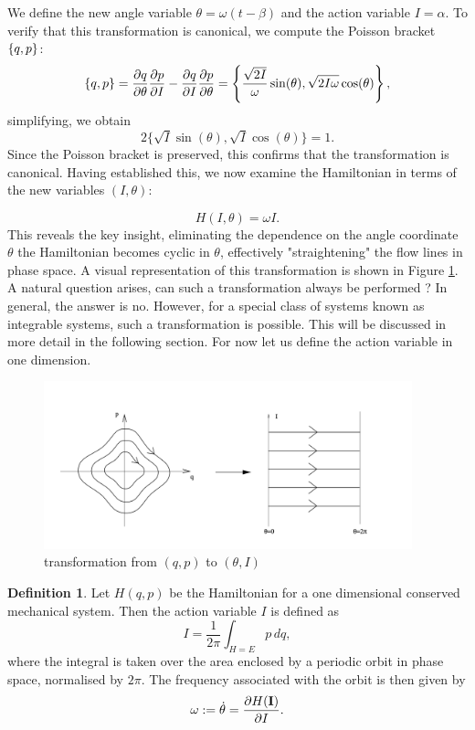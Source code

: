 \documentclass[12pt,oneside]{report}
\theoremstyle{definition}
\newtheorem{definition}{Definition}
\begin{document}
We define the new angle variable $\theta = \omega (t - \beta)$ and the action variable $I = \alpha$. To verify that this transformation is canonical, we compute the Poisson bracket $\displaystyle \left\{ q , p \right\}$:
$$\displaystyle \left\{ q , p \right\} = \frac{\partial q}{\partial \theta} \frac{\partial p}{\partial I} - \frac{\partial q}{\partial I} \frac{\partial p}{\partial \theta} = \left\{\frac{\sqrt{2I}}{\omega} \sin(\theta), \sqrt{2I\omega} \cos(\theta)\right\}, $$
simplifying, we obtain
$$ 2 \{ \sqrt{I} \sin(\theta), \sqrt{I} \cos(\theta) \} = 1. $$ Since the Poisson bracket is preserved, this confirms that the transformation is canonical. Having established this, we now examine the Hamiltonian in terms of the new variables $(I, \theta)$:

$$ H(I,\theta) = \omega I. $$ 
This reveals the key insight, eliminating the dependence on the angle coordinate $\theta$ the Hamiltonian becomes cyclic in $\theta$, effectively "straightening" the flow lines in phase space. A visual representation of this transformation is shown in Figure \ref{flow lines action}. A natural question arises, can such a transformation always be performed ? In general, the answer is no. However, for a special class of systems known as integrable systems, such a transformation is possible. This will be discussed in more detail in the following section. For now let us define the action variable in one dimension.
\begin{figure}[htbp]
    \centering
    \includegraphics[width=0.95\textwidth]{figures/flow lines.png}
    \caption{transformation from $(q,p)$ to $(\theta,I)$ \cite{DavidTong}}
    \label{flow lines action}
\end{figure}


\begin{definition}
   Let $ H(q,p) $ be the Hamiltonian  for a one dimensional conserved mechanical system. Then the action variable $I$ is defined as
$$
I = \frac{1}{2\pi} \int_{H=E} p\,dq,
$$
where the integral is taken over the area enclosed by a periodic orbit in phase space, normalised by $2\pi$. The frequency associated with the orbit is then given by
$$\omega := \dot{\theta} = \displaystyle\frac{\partial H(\textbf{I})}{\partial I}.$$
\end{definition}
\end{document}
